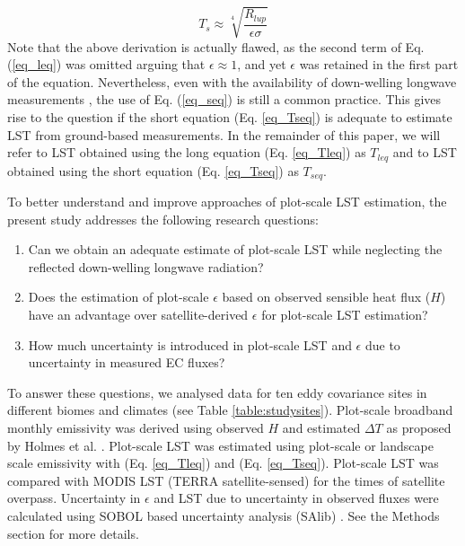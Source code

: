 \documentclass[fleqn,10pt]{wlscirep}
\begin{document}
\begin{equation}\label{eq_Tseq}
T_{s} \approx \sqrt[4]{\frac{R_{lup}}{\epsilon \sigma}}
\end{equation} 
Note that the above derivation is actually flawed, as the second term of Eq. (\ref{eq_leq}) was omitted arguing that $\epsilon\approx 1$, and yet $\epsilon$ was retained in the first part of the equation. Nevertheless, even with the availability of down-welling longwave measurements \cite{stephens1995review}, the use of Eq. (\ref{eq_seq}) is still a common practice\cite{crago_use_2014-2,mallick2018bridging}. This gives rise to the question if the short equation (Eq. \ref{eq_Tseq}) is adequate to estimate LST from ground-based measurements. In the remainder of this paper, we will refer to LST obtained using the long equation (Eq. \ref{eq_Tleq}) as $T_{leq}$ and to LST obtained using the short equation (Eq. \ref{eq_Tseq}) as $T_{seq}$.


To better understand and improve approaches of plot-scale LST estimation, the present study addresses the following research questions:
\begin{enumerate}
	\item Can we obtain an adequate estimate of plot-scale LST while neglecting the reflected down-welling longwave radiation?
	\item Does the estimation of plot-scale $\epsilon$ based on observed sensible heat flux ($H$) have an advantage over satellite-derived $\epsilon$ for plot-scale LST estimation?
    \item How much uncertainty is introduced in plot-scale LST and $\epsilon$ due to uncertainty in measured EC fluxes?
    
\end{enumerate}    
To answer these questions, we analysed data for ten eddy covariance sites in different biomes and climates (see Table \ref{table:studysites}).
Plot-scale broadband monthly emissivity was derived using observed $H$ and estimated $\Delta T$ as proposed by Holmes et al. \cite{holmes_land_2009}.  Plot-scale LST was estimated using plot-scale or landscape scale emissivity with (Eq. \ref{eq_Tleq}) and (Eq. \ref{eq_Tseq}). Plot-scale LST was compared with MODIS LST (TERRA satellite-sensed) for the times of satellite overpass. Uncertainty in $\epsilon$ and LST due to uncertainty in observed fluxes were calculated using SOBOL based uncertainty analysis (SAlib) \cite{rosolem2012fully}. %
See the Methods section for more details.
\end{document}
